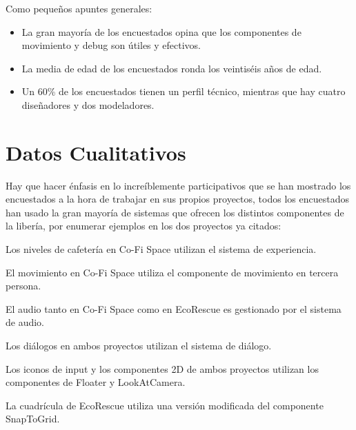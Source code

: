 Como pequeños apuntes generales:
\begin{itemize}
    \item La gran mayoría de los encuestados opina que los componentes de movimiento y debug son útiles y efectivos.
    \item La media de edad de los encuestados ronda los veintiséis años de edad.
    \item Un 60\% de los encuestados tienen un perfil técnico, mientras que hay cuatro diseñadores y dos modeladores.
\end{itemize}

\section{Datos Cualitativos}
Hay que hacer énfasis en lo increíblemente participativos que se han mostrado los encuestados a la hora de trabajar en sus propios proyectos, todos los encuestados han usado la gran mayoría de sistemas que ofrecen
los distintos componentes de la libería, por enumerar ejemplos en los dos proyectos ya citados:
\begin{compactitem}
    \item Los niveles de cafetería en Co-Fi Space utilizan el sistema de experiencia.
    \item El movimiento en Co-Fi Space utiliza el componente de movimiento en tercera persona.
    \item El audio tanto en Co-Fi Space como en EcoRescue es gestionado por el sistema de audio.
    \item Los diálogos en ambos proyectos utilizan el sistema de diálogo.
    \item Los iconos de input y los componentes 2D de ambos proyectos utilizan los componentes de Floater y LookAtCamera.
    \item La cuadrícula de EcoRescue utiliza una versión modificada del componente SnapToGrid. 
\end{compactitem}

